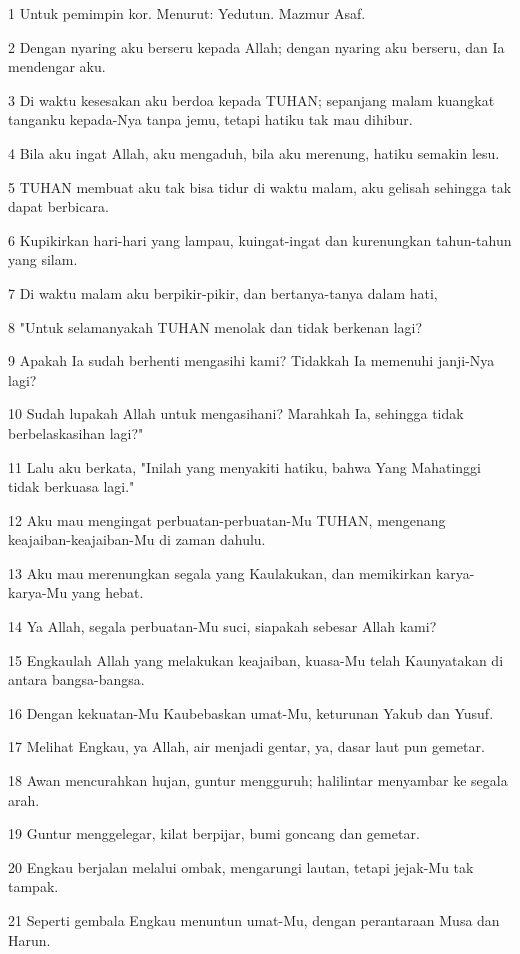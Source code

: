\par 1 Untuk pemimpin kor. Menurut: Yedutun. Mazmur Asaf.
\par 2 Dengan nyaring aku berseru kepada Allah; dengan nyaring aku berseru, dan Ia mendengar aku.
\par 3 Di waktu kesesakan aku berdoa kepada TUHAN; sepanjang malam kuangkat tanganku kepada-Nya tanpa jemu, tetapi hatiku tak mau dihibur.
\par 4 Bila aku ingat Allah, aku mengaduh, bila aku merenung, hatiku semakin lesu.
\par 5 TUHAN membuat aku tak bisa tidur di waktu malam, aku gelisah sehingga tak dapat berbicara.
\par 6 Kupikirkan hari-hari yang lampau, kuingat-ingat dan kurenungkan tahun-tahun yang silam.
\par 7 Di waktu malam aku berpikir-pikir, dan bertanya-tanya dalam hati,
\par 8 "Untuk selamanyakah TUHAN menolak dan tidak berkenan lagi?
\par 9 Apakah Ia sudah berhenti mengasihi kami? Tidakkah Ia memenuhi janji-Nya lagi?
\par 10 Sudah lupakah Allah untuk mengasihani? Marahkah Ia, sehingga tidak berbelaskasihan lagi?"
\par 11 Lalu aku berkata, "Inilah yang menyakiti hatiku, bahwa Yang Mahatinggi tidak berkuasa lagi."
\par 12 Aku mau mengingat perbuatan-perbuatan-Mu TUHAN, mengenang keajaiban-keajaiban-Mu di zaman dahulu.
\par 13 Aku mau merenungkan segala yang Kaulakukan, dan memikirkan karya-karya-Mu yang hebat.
\par 14 Ya Allah, segala perbuatan-Mu suci, siapakah sebesar Allah kami?
\par 15 Engkaulah Allah yang melakukan keajaiban, kuasa-Mu telah Kaunyatakan di antara bangsa-bangsa.
\par 16 Dengan kekuatan-Mu Kaubebaskan umat-Mu, keturunan Yakub dan Yusuf.
\par 17 Melihat Engkau, ya Allah, air menjadi gentar, ya, dasar laut pun gemetar.
\par 18 Awan mencurahkan hujan, guntur mengguruh; halilintar menyambar ke segala arah.
\par 19 Guntur menggelegar, kilat berpijar, bumi goncang dan gemetar.
\par 20 Engkau berjalan melalui ombak, mengarungi lautan, tetapi jejak-Mu tak tampak.
\par 21 Seperti gembala Engkau menuntun umat-Mu, dengan perantaraan Musa dan Harun.

